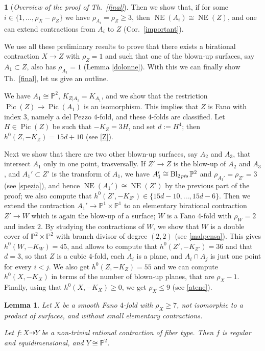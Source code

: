 \documentclass[a4paper,12pt]{amsart}
\newtheorem{lemma}[thm]{Lemma}
\theoremstyle{definition}
\newtheorem{prg}[thm]{}
\numberwithin{figure}{section}
\numberwithin{table}{section}
\newcommand{\pr}{\mathbb{P}}
\newcommand{\Pic}{\operatorname{Pic}}
\newcommand{\NE}{\operatorname{NE}}
\newcommand{\Bl}{\operatorname{Bl}}
\newcommand{\pts}{\text{\it pts}}
\begin{document}
\begin{prg}[\em Overview of the proof of Th.~\ref{final}]
  Then we show that, if for some $i\in\{1,\dotsc,\rho_X-\rho_Z\}$ we have $\rho_{A_i}=\rho_Z\geq 3$, then $\NE(A_i)\cong\NE(Z)$, and one can extend contractions from $A_i$ to $Z$ (Cor.~\ref{important}).

  We use all these preliminary results to prove that 
 there exists a birational contraction $X\to Z$ with $\rho_Z=1$ and such that one of the blown-up surfaces, say $A_1\subset Z$, also has $\rho_{A_1}=1$
 (Lemma \ref{dolonne}).
 With this we can finally show Th.~\ref{final}, let us give an outline.
 
   We have $A_1\cong\pr^2$, $K_{Z|A_1}=K_{A_1}$, and we show that the restriction $\Pic(Z)\to\Pic(A_1)$ is an isomorphism. This implies that $Z$ is Fano with index $3$, namely a del Pezzo $4$-fold, and these $4$-folds are classified. Let $H\in\Pic(Z)$ be such that $-K_Z=3H$, and set $d:=H^4$; then $h^0(Z,-K_Z)=15d+10$ (see \ref{Z}).

  Next we show that there are two other blown-up surfaces, say $A_2$ and $A_3$, that intersect $A_1$  only in one point, trasversally. If $Z'\to Z$ is the blow-up of $A_2$ and $A_3$, and $A_1'\subset Z'$ is the transform of $A_1$, we have $A_1'\cong\Bl_{2\mskip1mu\pts}\pr^2$ and $\rho_{A_1'}=\rho_{Z'}=3$ (see \ref{spezia}), and hence $\NE(A_1')\cong\NE(Z')$ by the previous part of the proof; we also compute that $h^0(Z',-K_{Z'})\in\{15d-10,\dotsc,15d-6\}$. Then we extend the contraction $A_1'\to \pr^1\times\pr^1$ to an elementary birational contraction $Z'\to W$ which is again the blow-up of a surface; $W$ is a Fano $4$-fold with $\rho_W=2$ and index $2$. By studying the contractions of $W$, we show that $W$ is a double cover of $\pr^2\times\pr^2$ with branch  divisor of degree $(2,2)$ (see \ref{malpensa}). This gives $h^0(W,-K_W)=45$, and allows to compute that $h^0(Z',-K_{Z'})=36$ and that $d=3$, so that $Z$ is a cubic $4$-fold, each $A_i$ is a plane, and $A_i\cap A_j$ is just one point for every $i<j$. 
We also get $h^0(Z,-K_Z)=55$ and we can compute $h^0(X,-K_X)$ in terms of the  number of blown-up planes, that are $\rho_X-1$. Finally, using that $h^0(X,-K_X)\geq 0$, we get $\rho_X\leq 9$ (see \ref{atene}).
\end{prg}
           \begin{lemma}\label{pasqua}
             Let $X$ be a smooth Fano $4$-fold with $\rho_X\geq 7$, not isomorphic to a product of surfaces, and without small elementary contractions.
             
Let $f\colon X\dasharrow Y$ be a non-trivial rational contraction of fiber type. Then $f$ is regular and equidimensional, and $Y\cong\pr^2$.
             \end{lemma}
\end{document}
